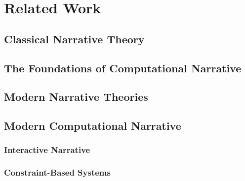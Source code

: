 \chapter{Related Work}

\section{Classical Narrative Theory}

\cite{Aristotle1917}
\cite{Freytag1894}
\cite{Forster1927}
\cite{Propp1973}


\section{The Foundations of Computational Narrative}

\cite{Klein1971, Klein1973}
\cite{Meehan1976}
\cite{Lebowitz1984}


\section{Modern Narrative Theories}

\cite{Iran-Nejad1987}
\cite{Oatley1995, Oatley1999}
\cite{Mar2004, Mar2008}
\cite{Zunshine2006}


\section{Modern Computational Narrative}


\subsection{Interactive Narrative}

\cite{Laurel1986}


\subsection{Constraint-Based Systems}


